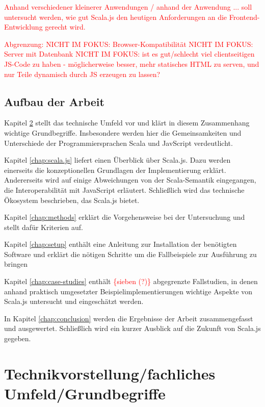 \documentclass[a4paper, 12pt, hidelinks, listof=totoc, listoftables=totoc, bibliography=totoc]{scrreprt}
\newcommand{\TODO}[1]{\textcolor{red}{#1}\newline}
\newcommand{\TODOi}[1]{\textcolor{red}{\{#1\}}}
\begin{document}
\TODO{Anhand verschiedener kleinerer Anwendungen / anhand der Anwendung ... soll untersucht werden, wie gut Scala.js den heutigen Anforderungen an die Frontend-Entwicklung gerecht wird.}

\TODO{Abgrenzung:}
\TODO{	NICHT IM FOKUS: Browser-Kompatibilität}
\TODO{	NICHT IM FOKUS: Server mit Datenbank}
\TODO{	NICHT IM FOKUS:  ist es gut/schlecht viel clientseitigen JS-Code zu haben - möglicherweise besser, mehr statisches HTML zu serven, und nur Teile dynamisch durch JS erzeugen zu lassen?}


\section{Aufbau der Arbeit}

Kapitel \ref{chap:basics} stellt das technische Umfeld vor und klärt in diesem Zusammenhang wichtige Grundbegriffe. Insbesondere werden hier die Gemeinsamkeiten und Unterschiede der Programmiersprachen Scala und JavScript verdeutlicht.

Kapitel \ref{chap:scala.js} liefert einen Überblick über Scala.js. Dazu werden einerseits die konzeptionellen Grundlagen der Implementierung erklärt. Andererseits wird auf einige Abweichungen von der Scala-Semantik eingegangen, die Interoperabilität mit JavaScript erläutert. Schließlich wird das technische Ökosystem beschrieben, das Scala.js bietet.

Kapitel \ref{chap:methods} erklärt die Vorgehensweise bei der Untersuchung und stellt dafür Kriterien auf.

Kapitel \ref{chap:setup} enthält eine Anleitung zur Installation der benötigten Software und erklärt die nötigen Schritte um die Fallbeispiele zur Ausführung zu bringen

Kapitel \ref{chap:case-studies} enthält \TODOi{sieben (?)} abgegrenzte Fallstudien, in denen anhand praktisch umgesetzter Beispielimplementierungen wichtige Aspekte von Scala.js untersucht und eingeschätzt werden.

In Kapitel \ref{chap:conclusion} werden die Ergebnisse der Arbeit zusammengefasst und ausgewertet. Schließlich wird ein kurzer Ausblick auf die Zukunft von Scala.js gegeben.



\chapter{Technikvorstellung/fachliches Umfeld/Grundbegriffe}\label{chap:basics}
\end{document}
